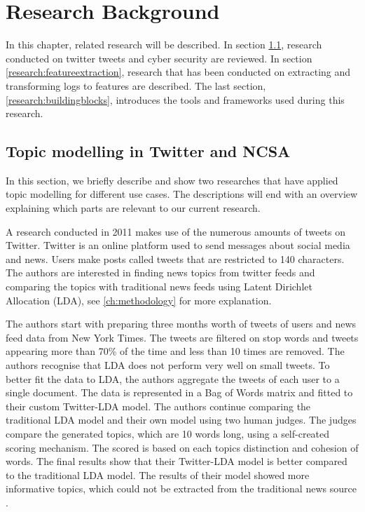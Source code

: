 \chapter{Research Background}  \label{ch:research}

In this chapter, related research will be described. In section \ref{research:relatedwork}, research conducted on twitter tweets and cyber security are reviewed. In section \ref{research:featureextraction}, research that has been conducted on extracting and transforming logs to features are described. The last section, \ref{research:buildingblocks}, introduces the tools and frameworks used during this research.

\section{Topic modelling in Twitter and NCSA} \label{research:relatedwork}
In this section, we briefly describe and show two researches that have applied topic modelling for different use cases. The descriptions will end with an overview explaining which parts are relevant to our current research. 

\setlength{\parindent}{3ex} A research conducted in 2011 makes use of the numerous amounts of tweets on Twitter. Twitter is an online platform used to send messages about social media and news. Users make posts called tweets that are restricted to 140 characters. The authors are interested in finding news topics from twitter feeds and comparing the topics with traditional news feeds using Latent Dirichlet Allocation (LDA), see \ref{ch:methodology} for more explanation.

The authors start with preparing three months worth of tweets of users and news feed data from New York Times. The tweets are filtered on stop words and tweets appearing more than 70\% of the time and less than 10 times are removed. The authors recognise that LDA does not perform very well on small tweets. To better fit the data to LDA, the authors aggregate the tweets of each user to a single document. The data is represented in a Bag of Words matrix and fitted to their custom Twitter-LDA model. The authors continue comparing the traditional LDA model and their own model using two human judges. The judges compare the generated topics, which are 10 words long, using a self-created scoring mechanism. The scored is based on each topics distinction and cohesion of words. The final results show that their Twitter-LDA model is better compared to the traditional LDA model. The results of their model showed more informative topics, which could not be extracted from the traditional news source \cite{Zhao2011ComparingModels}. 

